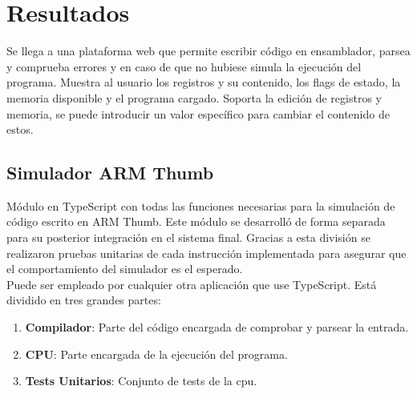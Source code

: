 \section{Resultados}
    Se llega a una plataforma web que permite escribir código en ensamblador, parsea y comprueba errores y en caso de que no hubiese simula la ejecución del programa.
    Muestra al usuario los registros y su contenido, los flags de estado, la memoria disponible y el programa cargado.
    Soporta la edición de registros y memoria, se puede introducir un valor específico para cambiar el contenido de estos.

    \subsection{Simulador ARM Thumb}
    {
        Módulo en TypeScript con todas las funciones necesarias para la simulación de código escrito en ARM Thumb.
        Este módulo se desarrolló de forma separada para su posterior integración en el sistema final.
        Gracias a esta división se realizaron pruebas unitarias de cada instrucción implementada
        para asegurar que el comportamiento del simulador es el esperado. \\

        Puede ser empleado por cualquier otra aplicación que use TypeScript. Está dividido en tres grandes partes:
        \begin{enumerate}
            \item \textbf{Compilador}: Parte del código encargada de comprobar y parsear la entrada.
            \item \textbf{CPU}: Parte encargada de la ejecución del programa.
            \item \textbf{Tests Unitarios}: Conjunto de tests de la cpu.
        \end{enumerate}
    
        
}
